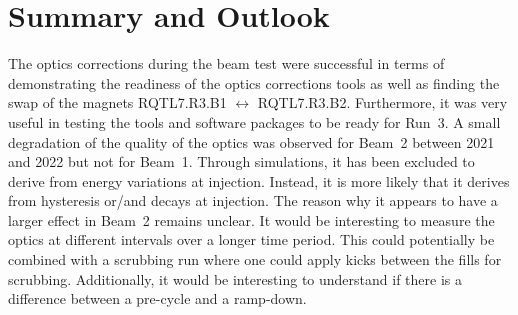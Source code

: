 \documentclass[a4paper]{cernatsnote}
\begin{document}
\section{Summary and Outlook}
The optics corrections during the beam test were successful in terms of demonstrating the readiness of the optics corrections tools as well as finding the swap of the magnets RQTL7.R3.B1 $\leftrightarrow$ RQTL7.R3.B2. Furthermore, it was very useful in testing the tools and software packages to be ready for Run~3. A small degradation of the quality of the optics was observed for Beam~2 between 2021 and 2022 but not for Beam~1. Through simulations, it has been excluded to derive from energy variations at injection. Instead, it is more likely that it derives from hysteresis or/and decays at injection. The reason why it appears to have a larger effect in Beam~2 remains unclear. It would be interesting to measure the optics at different intervals over a longer time period. This could potentially be combined with a scrubbing run where one could apply kicks between the fills for scrubbing. Additionally, it would be interesting to understand if there is a difference between a pre-cycle and a ramp-down. 
\end{document}

